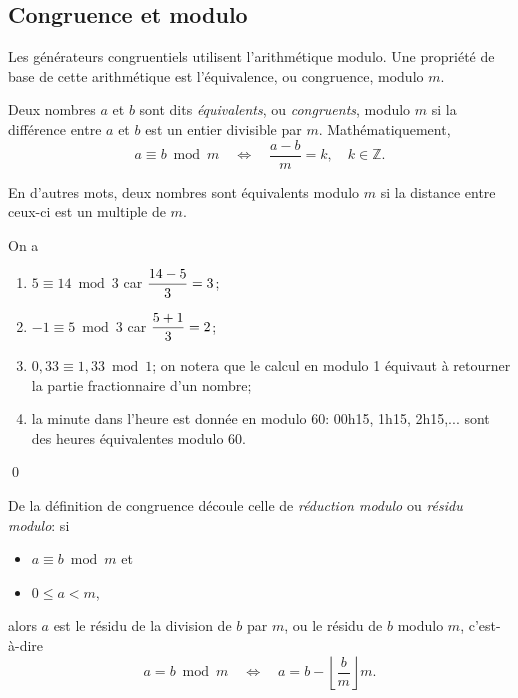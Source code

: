 \subsection{Congruence et modulo}

Les générateurs congruentiels utilisent l'arithmétique modulo. Une
propriété de base de cette arithmétique est l'équivalence, ou
congruence, modulo $m$.

\begin{definition}
  Deux nombres $a$ et $b$ sont dits \emph{équivalents}, ou
  \emph{congruents}, modulo $m$ si la différence entre $a$ et $b$ est
  un entier divisible par $m$. Mathématiquement,
  \begin{displaymath}
    a \equiv b \bmod m \quad\Leftrightarrow\quad \frac{a - b}{m} = k, \quad
    k \in \mathbb{Z}.
  \end{displaymath}
\end{definition}

En d'autres mots, deux nombres sont équivalents modulo $m$ si la
distance entre ceux-ci est un multiple de $m$.

\begin{exemple}
  On a
  \begin{enumerate}
  \item $5 \equiv 14 \bmod 3$ car $\displaystyle \frac{14 - 5}{3} = 3$;
  \item $-1 \equiv 5 \bmod 3$ car $\displaystyle \frac{5 + 1}{3} = 2$;
  \item $0,33 \equiv 1,33 \bmod 1$; on notera que le calcul en modulo 1
    équivaut à retourner la partie fractionnaire d'un nombre;
  \item la minute dans l'heure est donnée en modulo 60: 00h15, 1h15,
    2h15,... sont des heures équivalentes modulo 60.
  \end{enumerate}
  \qed
\end{exemple}

De la définition de congruence découle celle de \emph{réduction
  modulo} ou \emph{résidu modulo}: si
\begin{itemize}
\item $a \equiv b \bmod m$ et
\item $0 \leq a < m$,
\end{itemize}
alors $a$ est le résidu de la division de $b$ par $m$, ou le résidu de
$b$ modulo $m$, c'est-à-dire
\begin{displaymath}
  a = b \bmod m \quad\Leftrightarrow\quad a = b - \left\lfloor
    \frac{b}{m} \right\rfloor m.
\end{displaymath}

